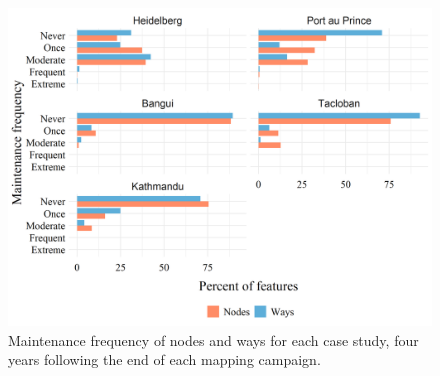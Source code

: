 \begin{figure} %
    \centering %
    \includegraphics[width = \textwidth]{Images/typesmaint.png} %
    \caption{Maintenance frequency of nodes and ways for each case study, four years following the end of each mapping campaign.} %
    \label{fig:types} %
\end{figure}

